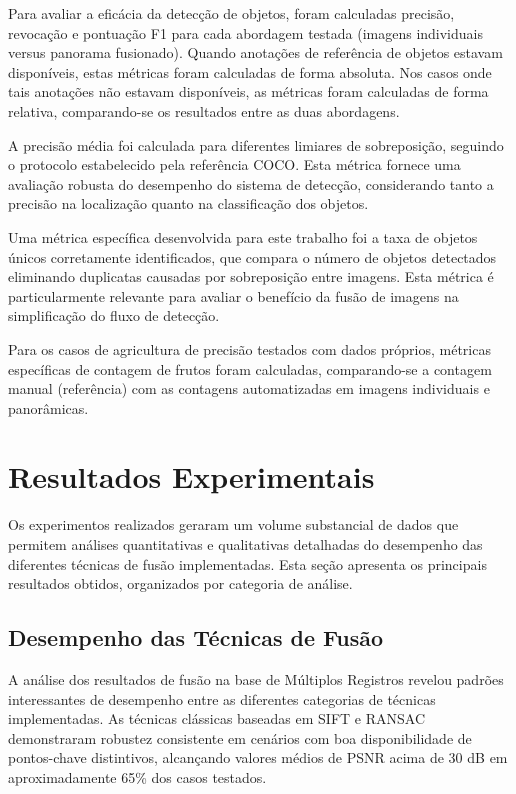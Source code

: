 Para avaliar a eficácia da detecção de objetos, foram calculadas precisão, revocação e pontuação F1 para cada abordagem testada (imagens individuais versus panorama fusionado). Quando anotações de referência de objetos estavam disponíveis, estas métricas foram calculadas de forma absoluta. Nos casos onde tais anotações não estavam disponíveis, as métricas foram calculadas de forma relativa, comparando-se os resultados entre as duas abordagens.

A precisão média foi calculada para diferentes limiares de sobreposição, seguindo o protocolo estabelecido pela referência COCO. Esta métrica fornece uma avaliação robusta do desempenho do sistema de detecção, considerando tanto a precisão na localização quanto na classificação dos objetos.

Uma métrica específica desenvolvida para este trabalho foi a taxa de objetos únicos corretamente identificados, que compara o número de objetos detectados eliminando duplicatas causadas por sobreposição entre imagens. Esta métrica é particularmente relevante para avaliar o benefício da fusão de imagens na simplificação do fluxo de detecção.

Para os casos de agricultura de precisão testados com dados próprios, métricas específicas de contagem de frutos foram calculadas, comparando-se a contagem manual (referência) com as contagens automatizadas em imagens individuais e panorâmicas.

\section{Resultados Experimentais}

Os experimentos realizados geraram um volume substancial de dados que permitem análises quantitativas e qualitativas detalhadas do desempenho das diferentes técnicas de fusão implementadas. Esta seção apresenta os principais resultados obtidos, organizados por categoria de análise.

\subsection{Desempenho das Técnicas de Fusão}

A análise dos resultados de fusão na base de Múltiplos Registros revelou padrões interessantes de desempenho entre as diferentes categorias de técnicas implementadas. As técnicas clássicas baseadas em SIFT e RANSAC demonstraram robustez consistente em cenários com boa disponibilidade de pontos-chave distintivos, alcançando valores médios de PSNR acima de 30 dB em aproximadamente 65\% dos casos testados.


